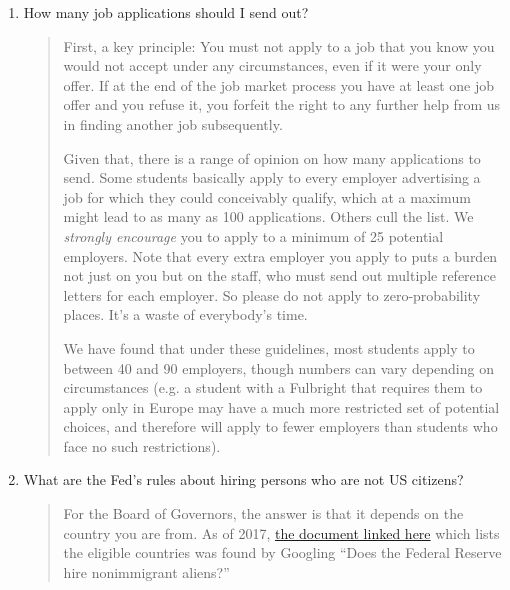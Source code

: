 \documentclass{\classes/econtex}
\providecommand\phantomsection{}
\begin{document}
\begin{enumerate}
\begin{quote}
    \end{quote}
  \item  {} 
    How many job applications should I send out?

    \begin{quote}
      First, a key principle: You must not apply to a job that you know you would not
      accept under any circumstances, even if it were your only offer.  If
      at the end of the job market process you have at least one job offer
      and you refuse it, you forfeit the right to any further help from us
      in finding another job subsequently.  %

      Given that, there is a range of opinion on how many applications to send.  Some students basically apply to every employer advertising a job for which they could conceivably qualify, which at a maximum might lead to as many as 100 applications.  Others cull the list.  We \textit{strongly encourage} you to apply to a minimum of 25 potential employers.  Note that every extra employer you apply to puts a burden not just on you but on the staff, who must send out multiple reference letters for each employer.  So please do not apply to zero-probability places.  It's a waste of everybody's time.

      We have found that under these guidelines, most students apply to between 
      40 and 90 employers, though numbers can vary depending on circumstances 
      (e.g. a student with a Fulbright that requires them to apply only in 
      Europe may have a much more restricted set of potential choices,
      and therefore will apply to fewer employers than students who face
      no such restrictions).


      \ifdvi\phantomsection\hypertarget{FedHiringRules}{}\fi

    \end{quote}
  \item  {}  What are the Fed's rules about hiring persons who are not US citizens? 

    \begin{quote}
      For the Board of Governors, the answer is that it depends on the country you are from.  As of 2017, \href{https://www.federalreserve.gov/boarddocs/srletters/2006/SR0614a3.pdf}{the document linked here} which lists the eligible countries was found by Googling ``Does the Federal Reserve hire nonimmigrant aliens?'' 


\end{quote}
\end{enumerate}
\end{document}
